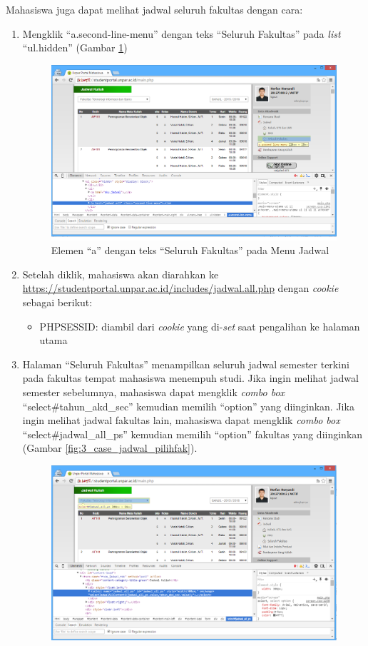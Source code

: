 Mahasiswa juga dapat melihat jadwal seluruh fakultas dengan cara:
\begin{enumerate}
	\item Mengklik ``a.second-line-menu'' dengan teks ``Seluruh Fakultas'' pada \textit{list} ``ul.hidden'' (Gambar \ref{fig:3_case_jadwal_seluruh})
	\begin{figure}[H]
			\centering
			\includegraphics[scale=0.5]{Gambar/case-jadwal-seluruh}
			\caption{Elemen ``a'' dengan teks ``Seluruh Fakultas'' pada Menu Jadwal} 
			\label{fig:3_case_jadwal_seluruh}
		\end{figure}
	\item Setelah diklik, mahasiswa akan diarahkan ke \url{https://studentportal.unpar.ac.id/includes/jadwal.all.php} dengan \textit{cookie} sebagai berikut:
\begin{itemize}
	\item PHPSESSID: diambil dari \textit{cookie} yang di-\textit{set} saat pengalihan ke halaman utama
\end{itemize}
		\item Halaman ``Seluruh Fakultas'' menampilkan seluruh jadwal semester terkini pada fakultas tempat mahasiswa menempuh studi. Jika ingin melihat jadwal semester sebelumnya, mahasiswa dapat mengklik \textit{combo box} ``select\#tahun\_akd\_sec'' kemudian memilih ``option'' yang diinginkan. Jika ingin melihat jadwal fakultas lain, mahasiswa dapat mengklik \textit{combo box} ``select\#jadwal\_all\_ps'' kemudian memilih ``option'' fakultas yang diinginkan (Gambar \ref{fig:3_case_jadwal_pilihfak}).
		\begin{figure}[H]
			\centering
			\includegraphics[scale=0.5]{Gambar/case-jadwal-pilihfak}

\end{figure}
\end{enumerate}
